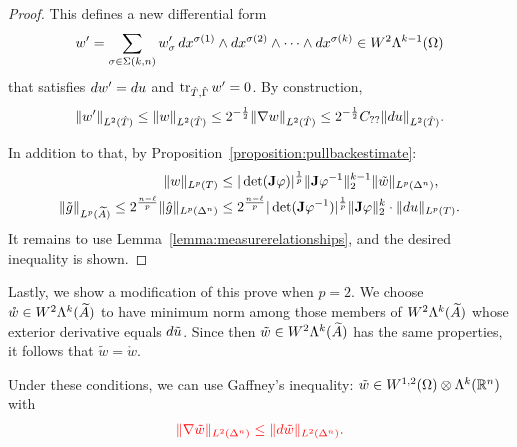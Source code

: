 \documentclass[10pt,a4paper]{article}
\begin{document}
\begin{proof}
    This defines a new differential form 
    \begin{gather}
        w'
        = 
        \sum_{ \sigma \in \Sigma(k,n) } 
        w'_{\sigma} \, 
        dx^{\sigma(1)} \wedge dx^{\sigma(2)} \wedge \cdots \wedge dx^{\sigma(k)}
        \in
        W^{2}\Lambda^{k-1}(\Omega)
    \end{gather}
    that satisfies $d w' = d u$ and $\operatorname{tr}_{\hat T,\hat\Gamma} w' = 0$. By construction, 
    \begin{align*}
        \| w' \|_{L^{2}(\hat T)}
        \leq 
        \| w \|_{L^{2}(\hat T)}
        \leq 
        2^{-\frac 1 2}
        \| \nabla w \|_{L^{2}(\hat T)}
        \leq 
        2^{-\frac 1 2}
        C_{??} %
        \| \cartan u \|_{L^{2}(\hat T)}
        .
    \end{align*}
    
    In addition to that, by Proposition~\ref{proposition:pullbackestimate}:
    \begin{align*}
        \| w \|_{L^{p}(T)}
        &\leq 
        |\det({\mathbf{J}} \varphi)|^{\frac 1 p} 
        \|  {\mathbf{J}} \varphi^{-1}  \|_{2}^{k-1}
        \| \tilde w \|_{L^{p}(\Delta^n)}
        ,
        \\
        \| \tilde g \|_{L^{p}(\widetilde {A})}
        \leq 
        2^{\frac {n-\ell} p}
        \| \hat g \|_{L^{p}(\Delta^n)}
        &\leq 
        2^{\frac {n-\ell} p}
        |\det( {\mathbf{J}} \varphi^{-1} )|^{\frac 1 p} 
        \| {\mathbf{J}} \varphi \|_{2}^{k}
        \cdot 
        \| d u \|_{L^{p}(T)}
        .
    \end{align*}
    It remains to use Lemma~\ref{lemma:measurerelationships}, and the desired inequality is shown. 
\end{proof}



    Lastly, we show a modification of this prove when $p=2$. 
    We choose $\mathring w \in W^{2}\Lambda^{k}(\widetilde {A})$ to have minimum norm among those members of $W^{2}\Lambda^{k}(\widetilde {A})$ whose exterior derivative equals $d \tilde u$. Since then $\tilde w \in W^{2}\Lambda^{k}(\widetilde {A})$ has the same properties,
    it follows that $\tilde w = \mathring w$. 
    
    Under these conditions, we can use Gaffney's inequality: %
    $\tilde w \in W^{1,2}(\Omega) \otimes \Lambda^{k}({\mathbb R}^{n})$ with 
    \begin{align}\color{red}
        \| \nabla \tilde w \|_{L^{2}(\Delta^{n})}
        \leq 
        \| d \tilde w \|_{L^{2}(\Delta^{n})}
        .
    \end{align} %
    
\end{document}
